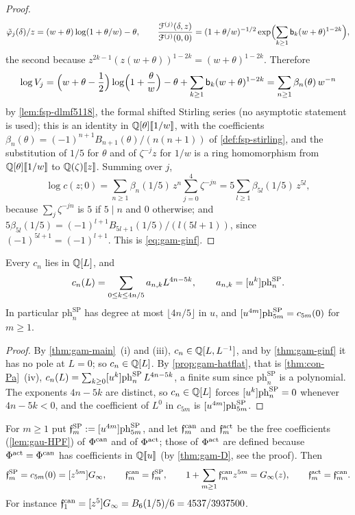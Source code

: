 \begin{proof}
\[
\tilde\varphi_j(\delta)/z=(w+\theta)\log(1+\theta/w)-\theta,\qquad \frac{\mathcal{F}^{(j)}(\delta,z)}{\mathcal{F}^{(j)}(0,0)}=(1+\theta/w)^{-1/2}\exp\Bigl(\sum_{k\geq 1}\mathsf{b}_k(w+\theta)^{1-2k}\Bigr),
\]
the second because $z^{2k-1}(z(w+\theta))^{1-2k}=(w+\theta)^{1-2k}$. Therefore
\[
\log V_j=\Bigl(w+\theta-\frac12\Bigr)\log\Bigl(1+\frac{\theta}{w}\Bigr)-\theta+\sum_{k\geq 1}\mathsf{b}_k(w+\theta)^{1-2k}=\sum_{n\geq 1}\beta_n(\theta)\,w^{-n}
\]
by \cref{lem:fsp-dlmf5118}, the formal shifted Stirling series (no asymptotic statement is used); this is an identity in $\mathbb{Q}[\theta][\![ 1/w ]\!]$, with the coefficients $\beta_n(\theta)=(-1)^{n+1}B_{n+1}(\theta)/(n(n+1))$ of \cref{def:fsp-stirling}, and the substitution of $1/5$ for $\theta$ and of $\zeta^{-j}z$ for $1/w$ is a ring homomorphism from $\mathbb{Q}[\theta][\![ 1/w ]\!]$ to $\mathbb{Q}(\zeta)[\![ z ]\!]$. Summing over $j$,
\[
\log c(z;0)=\sum_{n\geq 1}\beta_n(1/5)\,z^n\sum_{j=0}^4\zeta^{-jn}=5\sum_{l\geq 1}\beta_{5l}(1/5)\,z^{5l},
\]
because $\sum_j\zeta^{-jn}$ is $5$ if $5\mid n$ and $0$ otherwise; and $5\beta_{5l}(1/5)=(-1)^{l+1}B_{5l+1}(1/5)/(l(5l+1))$, since $(-1)^{5l+1}=(-1)^{l+1}$. This is \eqref{eq:gam-ginf}.
\end{proof}

\begin{cor}
\label{cor:gam-poly}
Every $c_n$ lies in $\mathbb{Q}[L]$, and
\[
c_n(L)=\sum_{0\leq k\leq 4n/5}a_{n,k}L^{4n-5k},\qquad a_{n,k}=[u^k]\mathrm{ph}^{\mathrm{SP}}_n.
\]
In particular $\mathrm{ph}^{\mathrm{SP}}_n$ has degree at most $\lfloor 4n/5\rfloor$ in $u$, and $[u^{4m}]\mathrm{ph}^{\mathrm{SP}}_{5m}=c_{5m}(0)$ for $m\geq 1$.
\end{cor}

\begin{proof}
By \cref{thm:gam-main}~(i) and (iii), $c_n\in\mathbb{Q}[L,L^{-1}]$, and by \cref{thm:gam-ginf} it has no pole at $L=0$; so $c_n\in\mathbb{Q}[L]$. By \cref{prop:gam-hatflat}, that is \cref{thm:con-Pa}~(iv), $c_n(L)=\sum_{k\geq 0}[u^k]\mathrm{ph}^{\mathrm{SP}}_n\,L^{4n-5k}$, a finite sum since $\mathrm{ph}^{\mathrm{SP}}_n$ is a polynomial. The exponents $4n-5k$ are distinct, so $c_n\in\mathbb{Q}[L]$ forces $[u^k]\mathrm{ph}^{\mathrm{SP}}_n=0$ whenever $4n-5k<0$, and the coefficient of $L^0$ in $c_{5m}$ is $[u^{4m}]\mathrm{ph}^{\mathrm{SP}}_{5m}$.
\end{proof}

\begin{cor}
\label{cor:gam-free}
For $m\geq 1$ put $\mathfrak{f}^{\mathrm{SP}}_m:=[u^{4m}]\mathrm{ph}^{\mathrm{SP}}_{5m}$, and let $\mathfrak{f}^{\mathrm{can}}_m$ and $\mathfrak{f}^{\mathrm{act}}_m$ be the free coefficients (\cref{lem:gau-HPF}) of $\Phi^{\mathrm{can}}$ and of $\Phi^{\mathrm{act}}$; those of $\Phi^{\mathrm{act}}$ are defined because $\Phi^{\mathrm{act}}=\Phi^{\mathrm{can}}$ has coefficients in $\mathbb{Q}[\![ u ]\!]$ (by \cref{thm:gam-D}, see the proof). Then
\[
\mathfrak{f}^{\mathrm{SP}}_m=c_{5m}(0)=[z^{5m}]G_{\infty},\qquad \mathfrak{f}^{\mathrm{can}}_m=\mathfrak{f}^{\mathrm{SP}}_m,\qquad 1+\sum_{m\geq 1}\mathfrak{f}^{\mathrm{can}}_mz^{5m}=G_{\infty}(z),\qquad \mathfrak{f}^{\mathrm{act}}_m=\mathfrak{f}^{\mathrm{can}}_m.
\]
For instance $\mathfrak{f}^{\mathrm{can}}_1=[z^5]G_{\infty}=B_6(1/5)/6=4537/3937500$.
\end{cor}

